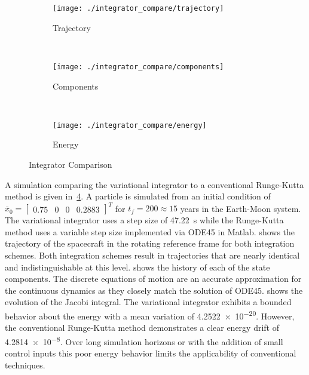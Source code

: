 \documentclass[letterpaper, preprint, paper,11pt]{AAS}	%
\begin{document}
\begin{figure} 
	\centering 
	\begin{subfigure}[h]{0.3\textwidth} 
		\texttt{[image: ./integrator\_compare/trajectory]} 
		\caption{Trajectory} \label{fig:compare_trajectory} 
	\end{subfigure}~ %
	\begin{subfigure}[htbp]{0.3\textwidth} 
		\texttt{[image: ./integrator\_compare/components]} 
		\caption{Components} \label{fig:compare_components} 
	\end{subfigure} ~ %
	\begin{subfigure}[htbp]{0.3\textwidth} 
		\texttt{[image: ./integrator\_compare/energy]} 
		\caption{Energy} \label{fig:compare_energy} 
	\end{subfigure} 
	\caption{Integrator Comparison}
	\label{fig:integrator_compare} 
\end{figure}
A simulation comparing the variational integrator to a conventional Runge-Kutta method is given in~\cref{fig:integrator_compare}.
A particle is simulated from an initial condition of \( \bar{x}_0 = \begin{bmatrix} 0.75 & 0 & 0 & 0.2883\end{bmatrix}^T \) for \( t_f = 200 \approx 15\) years in the Earth-Moon system.
The variational integrator uses a step size of \SI{47.22}{\second} while the Runge-Kutta method uses a variable step size implemented via ODE45 in Matlab.
 shows the trajectory of the spacecraft in the rotating reference frame for both integration schemes.
Both integration schemes result in trajectories that are nearly identical and indistinguishable at this level.
 shows the history of each of the state components. 
The discrete equations of motion are an accurate approximation for the continuous dynamics as they closely match the solution of ODE45.
 shows the evolution of the Jacobi integral.
The variational integrator exhibits a bounded behavior about the energy with a mean variation of \num{4.2522e-20}.
However, the conventional Runge-Kutta method demonstrates a clear energy drift of \num{4.2814e-8}. 
Over long simulation horizons or with the addition of small control inputs this poor energy behavior limits the applicability of conventional techniques.
\end{document}
